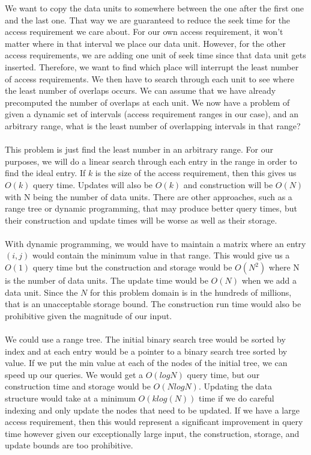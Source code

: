 \documentclass[conference]{acmsiggraph}
\begin{document}
We want to copy the data units to somewhere between the one after the first one and the last one. That way we are guaranteed to reduce the seek time for the access requirement we care about. For our own access requirement, it won't matter where in that interval we place our data unit. However, for the other access requirements, we are adding one unit of seek time since that data unit gets inserted. Therefore, we want to find which place will interrupt the least number of access requirements. We then have to search through each unit to see where the least number of overlaps occurs. We can assume that we have already precomputed the number of overlaps at each unit. We now have a problem of given a dynamic set of intervals (access requirement ranges in our case), and an arbitrary range, what is the least number of overlapping intervals in that range?\\
\\
This problem is just find the least number in an arbitrary range. For our purposes, we will do a linear search through each entry in the range in order to find the ideal entry. If $k$ is the size of the access requirement, then this gives us $O(k)$ query time. Updates will also be $O(k)$ and construction will be $O(N)$ with N being the number of data units. There are other approaches, such as a range tree or dynamic programming, that may produce better query times, but their construction and update times will be worse as well as their storage. \\
\\
With dynamic programming, we would have to maintain a matrix where an entry $(i,j)$ would contain the minimum value in that range. This would give us a $O(1)$ query time but the construction and storage would be $O(N^2)$ where N is the number of data units. The update time would be $O(N)$ when we add a data unit. Since the $N$ for this problem domain is in the hundreds of millions, that is an unacceptable storage bound. The construction run time would also be prohibitive given the magnitude of our input. \\
\\
We could use a range tree. The initial binary search tree would be sorted by index and at each entry would be a pointer to a binary search tree sorted by value. If we put the min value at each of the nodes of the initial tree, we can speed up our queries. We would get a $O(log N)$ query time, but our construction time and storage would be $O(N log N)$. Updating the data structure would take at a minimum $O(k log(N))$ time if we do careful indexing and only update the nodes that need to be updated. If we have a large access requirement, then this would represent a significant improvement in query time however given our exceptionally large input, the construction, storage, and update bounds are too prohibitive.  
\end{document}
